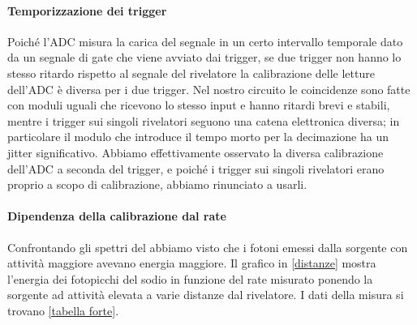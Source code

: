 \paragraph{Temporizzazione dei trigger}

%
Poiché l'ADC misura la carica del segnale in un certo intervallo temporale dato da un segnale di gate
che viene avviato dai trigger,
se due trigger non hanno lo stesso ritardo rispetto al segnale del rivelatore
la calibrazione delle letture dell'ADC è diversa per i due trigger.
Nel nostro circuito le coincidenze sono fatte con moduli uguali che ricevono lo stesso input
e hanno ritardi brevi e stabili,
mentre i trigger sui singoli rivelatori seguono una catena elettronica diversa;
in particolare il modulo che introduce il tempo morto per la decimazione ha un jitter significativo.
Abbiamo effettivamente osservato la diversa calibrazione dell'ADC a seconda del trigger,
e poiché i trigger sui singoli rivelatori erano proprio a scopo di calibrazione, abbiamo rinunciato a usarli.

\paragraph{Dipendenza della calibrazione dal rate}

Confrontando gli spettri del \na{} abbiamo visto che i fotoni emessi dalla sorgente con attività maggiore avevano energia maggiore.
Il grafico in \autoref{distanze} mostra l'energia dei fotopicchi del sodio in funzione del rate misurato ponendo la sorgente ad attività elevata a varie distanze dal rivelatore.
I dati della misura si trovano \autoref{tabella forte}.



